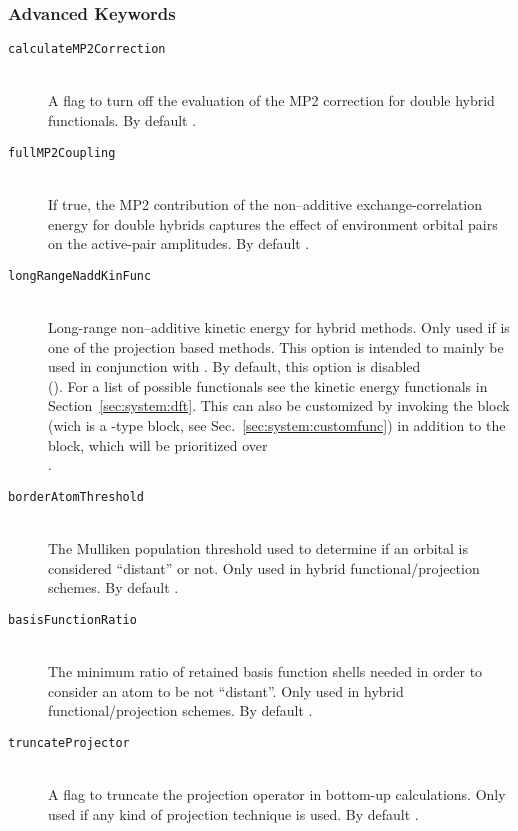 \subsubsection{Advanced Keywords}
\begin{description}
  \item [\texttt{calculateMP2Correction}]\hfill \\
    A flag to turn off the evaluation of the MP2 correction for double hybrid functionals. By default .
  \item [\texttt{fullMP2Coupling}]\hfill \\
    If true, the MP2 contribution of the non--additive exchange-correlation energy for double hybrids captures
    the effect of environment orbital pairs on the active-pair amplitudes. By default .
  \item [\texttt{longRangeNaddKinFunc}]\hfill \\
    Long-range non--additive kinetic energy for hybrid methods. Only used if  is one of
    the projection based methods. This option is intended to mainly be used in conjunction with
    . By default, this option is disabled\\ ().
    For a list of possible functionals see the kinetic energy functionals in Section~\ref{sec:system:dft}. This can also be customized by invoking the  block (wich is a -type block, see Sec.~\ref{sec:system:customfunc}) in addition to the  block, which will be prioritized over\\ .
  \item [\texttt{borderAtomThreshold}]\hfill \\
    The Mulliken population threshold used to determine if an orbital is considered ``distant'' or not.
    Only used in hybrid functional/projection schemes. By default .
  \item [\texttt{basisFunctionRatio}]\hfill \\
    The minimum ratio of retained basis function shells needed in order to consider an atom to be not
    ``distant''. Only used in hybrid functional/projection schemes. By default .
  \item [\texttt{truncateProjector}]\hfill \\
    A flag to truncate the projection operator in bottom-up calculations. Only used if any kind of projection
    technique is used. By default .

\end{description}
